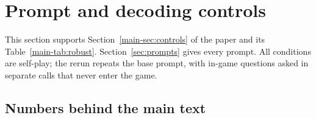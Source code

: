 \documentclass[10pt]{article}
\let\plainsubsection\subsection
\renewcommand{\subsection}{\FloatBarrier\needspace{8\baselineskip}\plainsubsection}
\let\plainsection\section
\renewcommand{\section}{\FloatBarrier\needspace{12\baselineskip}\plainsection}  %
\begin{document}
\begin{table}[h]
\caption{End-of-game behaviour in self-play (110 games per model; ``n/a'' marks a case with no games). The pool after round 9 is what the seats could have added up before deciding in round 10. \emph{At or ahead of fair pace}: the pool reached at least $12t$ after every round $t$ up to 9. The last row replays each game with every seat's round-10 move replaced by its round-9 move.}
\label{tab:endgame}
\centering\small

\end{table}

\section{Prompt and decoding controls}
\label{sec:controls}

This section supports Section~\ref{main-sec:controls} of the paper and its Table~\ref{main-tab:robust}. Section~\ref{sec:prompts} gives every prompt. All conditions are self-play; the rerun repeats the base prompt, with in-game questions asked in separate calls that never enter the game.

\subsection{Numbers behind the main text}
\end{document}
